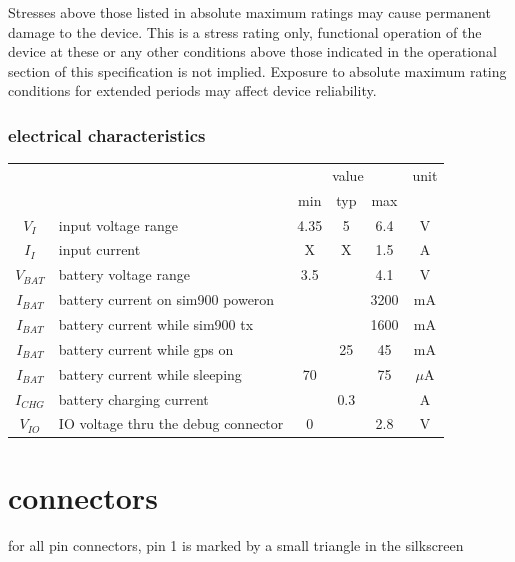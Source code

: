 \documentclass[a4paper,twoside]{refart}
\begin{document}
Stresses above those listed in absolute maximum ratings may cause permanent damage to the device. This is a stress rating only, functional operation of the device at these or any other conditions above those indicated in the operational section of this specification is not implied. Exposure to absolute maximum rating conditions for extended periods may affect device reliability.

\subsubsection{electrical characteristics}

\begin{tabular}{ |c|l|c|c|c|c| }
    \hline
    \multicolumn{2}{|c|}{} & \multicolumn{3}{|c|}{value} & unit \\ \cline{3-6}
    \multicolumn{2}{|c|}{} & min & typ & max & \\ \hline
    $V_{I}$ & input voltage range                      & 4.35  & 5     & 6.4  & V \\ \hline
    $I_{I}$ & input current                            & X     & X     & 1.5  & A \\ \hline
    $V_{BAT}$ & battery voltage range                  & 3.5   &       & 4.1  & V \\ \hline
    $I_{BAT}$ & battery current on sim900 poweron      &       &       & 3200 & mA \\ \hline
    $I_{BAT}$ & battery current while sim900 tx        &       &       & 1600 & mA \\ \hline
    $I_{BAT}$ & battery current while gps on           &       & 25    & 45   & mA \\ \hline
    $I_{BAT}$ & battery current while sleeping         & 70    &       & 75   & $\mu$A \\ \hline
    $I_{CHG}$ & battery charging current \footnotemark &       & 0.3   &   & A \\ \hline
    $V_{IO}$ & IO voltage thru the debug connector     & 0     &       & 2.8  & V \\ \hline
\end{tabular}


\section{connectors}
for all pin connectors, pin 1 is marked by a small triangle in the silkscreen
\end{document}
